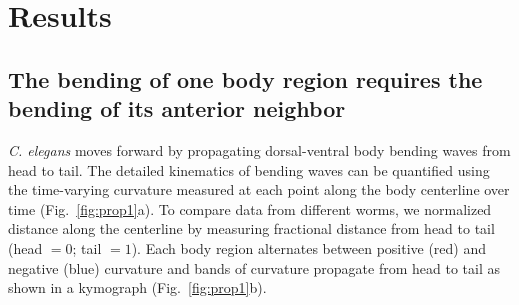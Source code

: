 \section{Results}
\subsection{The bending of one body region requires the bending of its anterior neighbor}

\textit{C. elegans} moves forward by propagating dorsal-ventral body bending waves from head to tail. 
The detailed kinematics of bending waves can be quantified using the time-varying curvature 
measured at each point along the body centerline over time (Fig.~\ref{fig:prop1}a). To compare data from different worms, we normalized distance along the centerline by measuring fractional distance 
from head to tail (head $=0$; tail $=1$). Each body region alternates between positive (red) and 
negative (blue) curvature and bands of curvature propagate from head to tail as shown in a 
kymograph (Fig.~\ref{fig:prop1}b). 




